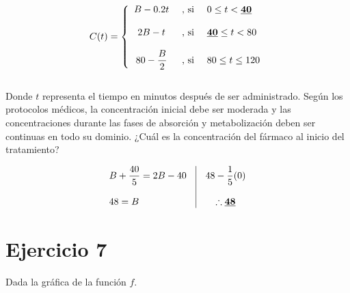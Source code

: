 \documentclass[12pt]{article}
\begin{document}
\[
C(t) = 
\left\{
  \begin{array}{c l l}
    B - 0.2t & \text{ , si } & 0 \leq t < \textbf{\underline{40}} \\\\
    2B - t & \text{ , si } & \textbf{\underline{40}} \leq t < 80 \\\\
    80 - \dfrac{B}{2} & \text{ , si } & 80 \leq t \leq 120
  \end{array}
\right.
\] \\

\noindent Donde $t$ representa el tiempo en minutos después de ser administrado. Según los protocolos médicos,
la concentración inicial debe ser moderada y las concentraciones durante las fases de absorción y metabolización
deben ser continuas en todo su dominio. ¿Cuál es la concentración del fármaco al inicio del tratamiento?

\[
\begin{array}{l|c}
  \begin{array}{l}
    B + \dfrac{40}{5} = 2B - 40 \\\\
    48 = B  
  \end{array}
  &
  \begin{array}{c}
    48 - \dfrac{1}{5}(0) \\\\
    \therefore \textbf{\underline{48}}
  \end{array}
\end{array}
\]





\newpage
\section*{Ejercicio 7}
\noindent Dada la gráfica de la función $f$.
\end{document}
